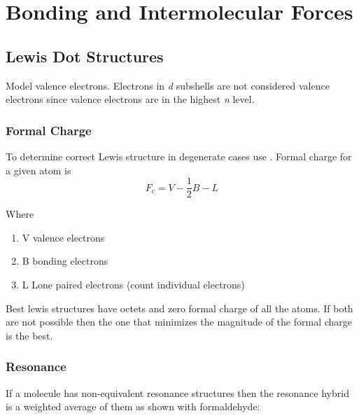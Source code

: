 \documentclass[../GChemReview.tex]{subfiles}
\begin{document}
  \chapter{Bonding and Intermolecular Forces}

  \section{Lewis Dot Structures}

  Model valence electrons. Electrons in \emph{d} subshells are not considered
  valence electrons since valence electrons are in the highest \emph{n} level.

  \subsection{Formal Charge}

  To determine correct Lewis structure in degenerate cases use . Formal charge for a given atom is 
  \begin{equation}
    F_{c} = V - \dfrac{1}{2}B - L
  \end{equation}

  Where
  \begin{enumerate}
    \item V valence electrons
    \item B bonding electrons
    \item L Lone paired electrons (count individual electrons)
  \end{enumerate}

  Best lewis structures have octets and zero formal charge of all the atoms. If
  both are not possible then the one that minimizes the magnitude of the formal
  charge is the best.

  \subsection{Resonance}

  If a molecule has non-equivalent resonance structures then the resonance
  hybrid is a weighted average of them as shown with formaldehyde:

\end{document}
